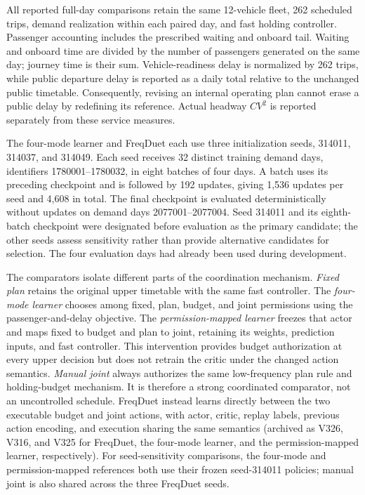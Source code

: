All reported full-day comparisons retain the same 12-vehicle fleet, 262 scheduled
trips, demand realization within each paired day, and fast holding controller.
Passenger accounting includes the prescribed waiting and onboard tail. Waiting
and onboard time are divided by the number of passengers generated on the same
day; journey time is their sum. Vehicle-readiness delay is normalized by 262
trips, while public departure delay is reported as a daily total relative to the
unchanged public timetable. Consequently, revising an internal operating plan
cannot erase a public delay by redefining its reference. Actual headway
\(CV^2\) is reported separately from these service measures.

The four-mode learner and FreqDuet each use three initialization seeds, 314011,
314037, and 314049. Each seed receives 32 distinct training demand days, identifiers
1780001--1780032, in eight batches of four days. A batch uses its preceding
checkpoint and is followed by 192 updates, giving 1,536 updates per seed and
4,608 in total. The final checkpoint is evaluated deterministically without
updates on demand days 2077001--2077004. Seed 314011 and its eighth-batch
checkpoint were designated before evaluation as the primary candidate; the
other seeds assess sensitivity rather than provide alternative candidates for
selection. The four evaluation days had already been used during development.

The comparators isolate different parts of the coordination mechanism.
\emph{Fixed plan} retains the original upper timetable with the same fast
controller. The \emph{four-mode learner} chooses among fixed, plan, budget, and
joint permissions using the passenger-and-delay objective. The
\emph{permission-mapped learner} freezes that actor and maps fixed to budget and
plan to joint, retaining its weights, prediction inputs, and fast controller.
This intervention provides budget authorization at every upper decision but
does not retrain the critic under the changed action semantics.
\emph{Manual joint} always authorizes the same low-frequency plan rule and
holding-budget mechanism. It is therefore a strong coordinated comparator,
not an uncontrolled schedule. FreqDuet instead learns directly between the two
executable budget and joint actions, with actor, critic, replay labels, previous
action encoding, and execution sharing the same semantics (archived as V326,
V316, and V325 for FreqDuet, the four-mode learner, and the permission-mapped
learner, respectively). For seed-sensitivity comparisons, the four-mode and
permission-mapped references both use their frozen seed-314011 policies; manual
joint is also shared across the three FreqDuet seeds.

